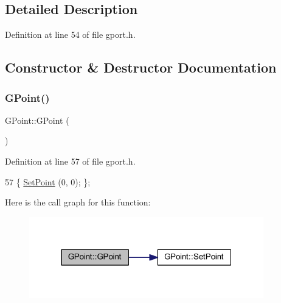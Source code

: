 \subsection{Detailed Description}


Definition at line 54 of file gport.\+h.



\subsection{Constructor \& Destructor Documentation}
\mbox{\label{class_g_point_a8454b1fc2b2094d4cf5fd8d57a9114d9}} 
\subsubsection{\texorpdfstring{G\+Point()}{GPoint()}\hspace{0.1cm}{\footnotesize\ttfamily [1/3]}}
{\footnotesize\ttfamily G\+Point\+::\+G\+Point (\begin{DoxyParamCaption}{ }\end{DoxyParamCaption})\hspace{0.3cm}{\ttfamily [inline]}}



Definition at line 57 of file gport.\+h.


\begin{DoxyCode}
57 \{ \mbox{\hyperlink{class_g_point_ad6f78b03b847082c2e2feb0a3612f0c5}{SetPoint}} (0, 0); \};
\end{DoxyCode}
Here is the call graph for this function\+:\nopagebreak
\begin{figure}[H]
\begin{center}
\leavevmode
\includegraphics[width=289pt]{class_g_point_a8454b1fc2b2094d4cf5fd8d57a9114d9_cgraph}
\end{center}
\end{figure}
\mbox{\label{class_g_point_a8198edcc7b38e155c8f1e117ca912fcb}} 
